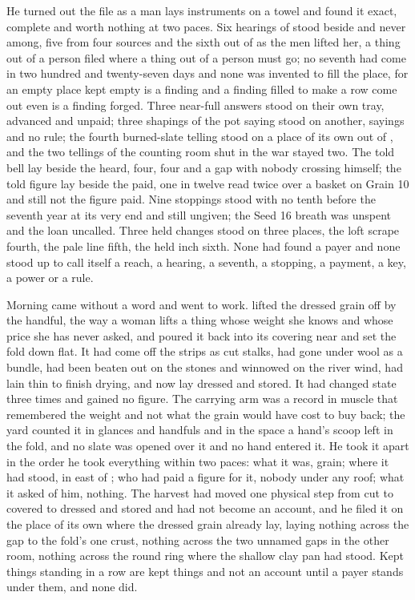 He turned out the file as a man lays instruments on a towel and found it exact, complete and worth nothing at two paces. Six hearings of  stood beside and never among, five from four sources and the sixth out of  as the men lifted her, a thing out of a person filed where a thing out of a person must go; no seventh had come in two hundred and twenty-seven days and none was invented to fill the place, for an empty place kept empty is a finding and a finding filled to make a row come out even is a finding forged. Three near-full answers stood on their own tray, advanced and unpaid; three shapings of the pot saying stood on another, sayings and no rule; the fourth burned-slate telling stood on a place of its own out of , and the two tellings of the counting room shut in the war stayed two. The told bell lay beside the heard, four, four and a gap with nobody crossing himself; the told figure lay beside the paid, one in twelve read twice over a basket on Grain 10 and still not the figure paid. Nine stoppings stood with no tenth before the seventh year at its very end and still ungiven; the Seed 16 breath was unspent and the loan uncalled. Three held changes stood on three places, the loft scrape fourth, the pale line fifth, the held inch sixth. None had found a payer and none stood up to call itself a reach, a hearing, a seventh, a stopping, a payment, a key, a power or a rule.

Morning came without a word and went to work.  lifted the dressed grain off  by the handful, the way a woman lifts a thing whose weight she knows and whose price she has never asked, and poured it back into its covering near  and set the fold down flat. It had come off the strips as cut stalks, had gone under wool as a bundle, had been beaten out on the stones and winnowed on the river wind, had lain thin to finish drying, and now lay dressed and stored. It had changed state three times and gained no figure. The carrying arm was a record in muscle that remembered the weight and not what the grain would have cost to buy back; the yard counted it in glances and handfuls and in the space a hand's scoop left in the fold, and no slate was opened over it and no hand entered it. He took it apart in the order he took everything within two paces: what it was, grain; where it had stood, in  east of ; who had paid a figure for it, nobody under any roof; what it asked of him, nothing. The harvest had moved one physical step from cut to covered to dressed and stored and had not become an account, and he filed it on the place of its own where the dressed grain already lay, laying nothing across the gap to the fold's one crust, nothing across the two unnamed gaps in the other room, nothing across the round ring where the shallow clay pan had stood. Kept things standing in a row are kept things and not an account until a payer stands under them, and none did.

